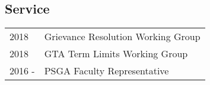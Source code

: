 \documentclass[margin,line,pifont,palatino,courier]{res}
\begin{document}
\begin{resume}











\section{\sc Service}

\begin{tabular}{@{}p{0.8in}p{4in}}
  2018 & Grievance Resolution Working Group \\
  2018 & GTA Term Limits Working Group\\
  2016 - & PSGA Faculty Representative\\
\end{tabular}



\end{resume}
\end{document}
